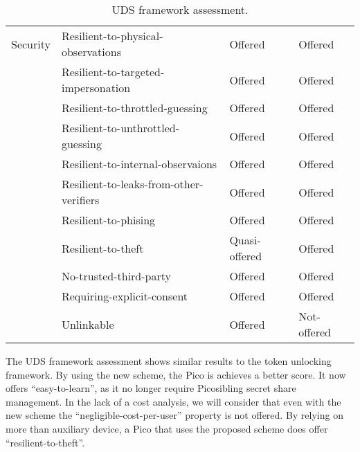 \begin{table}
\begin{tabular}{c|l|l|l}
    Security      & Resilient-to-physical-observations      & \cellcolor{green!25}Offered       	& \cellcolor{green!25}Offered         \\
    ~             & Resilient-to-targeted-impersonation     & \cellcolor{green!25}Offered       	& \cellcolor{green!25}Offered         \\
    ~             & Resilient-to-throttled-guessing         & \cellcolor{green!25}Offered       	& \cellcolor{green!25}Offered         \\
    ~             & Resilient-to-unthrottled-guessing       & \cellcolor{green!25}Offered       	& \cellcolor{green!25}Offered         \\
    ~             & Resilient-to-internal-observaions       & \cellcolor{green!25}Offered       	& \cellcolor{green!25}Offered         \\
    ~             & Resilient-to-leaks-from-other-verifiers & \cellcolor{green!25}Offered       	& \cellcolor{green!25}Offered         \\
    ~             & Resilient-to-phising                    & \cellcolor{green!25}Offered       	& \cellcolor{green!25}Offered         \\
    ~             & Resilient-to-theft                      & \cellcolor{yellow!25}Quasi-offered 	& \cellcolor{green!25}Offered         \\
    ~             & No-trusted-third-party                  & \cellcolor{green!25}Offered       	& \cellcolor{green!25}Offered         \\
    ~             & Requiring-explicit-consent              & \cellcolor{green!25}Offered       	& \cellcolor{green!25}Offered         \\
    ~             & Unlinkable                              & \cellcolor{green!25}Offered       	& \cellcolor{red!25}Not-offered     \\
    \end{tabular}
	
	\caption{UDS framework assessment.}
	\label{table:udsresults}
\end{table}

The UDS framework assessment shows similar results to the token unlocking framework. By using the new scheme, the Pico is achieves a better score. It now offers ``easy-to-learn'', as it no longer require Picosibling secret share management. In the lack of a cost analysis, we will consider that even with the new scheme the ``negligible-cost-per-user'' property is not offered. By relying on more than auxiliary device, a Pico that uses the proposed scheme does offer ``resilient-to-theft''.

